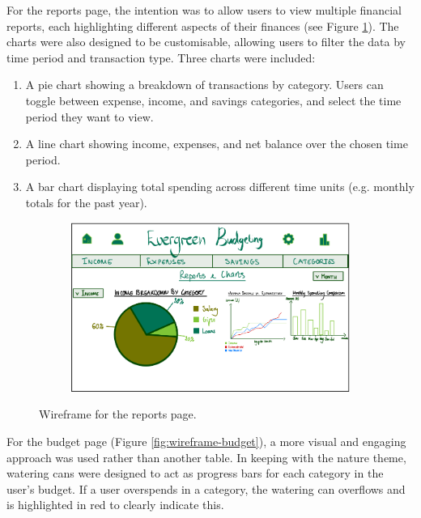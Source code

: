 \documentclass{l4proj}
\begin{document}
For the reports page, the intention was to allow users to view multiple financial reports, each highlighting different aspects of their finances (see Figure \ref{fig:wireframe-reports}). The charts were also designed to be customisable, allowing users to filter the data by time period and transaction type. Three charts were included:

\begin{enumerate}
    \item A pie chart showing a breakdown of transactions by category. Users can toggle between expense, income, and savings categories, and select the time period they want to view.
    \item A line chart showing income, expenses, and net balance over the chosen time period.
    \item A bar chart displaying total spending across different time units (e.g. monthly totals for the past year).
\end{enumerate}
\vspace{0.5em}

\begin{figure}[htb] 
    \centering
    \begin{subfigure}[b]{0.6\textwidth}
        \includegraphics[width=\textwidth]{images/Wireframes/wireframe-reports-desktop.png}
    \end{subfigure}   
    \caption{Wireframe for the reports page.}
    \label{fig:wireframe-reports}
\end{figure}

For the budget page (Figure \ref{fig:wireframe-budget}), a more visual and engaging approach was used rather than another table. In keeping with the nature theme, watering cans were designed to act as progress bars for each category in the user’s budget. If a user overspends in a category, the watering can overflows and is highlighted in red to clearly indicate this.
\end{document}
